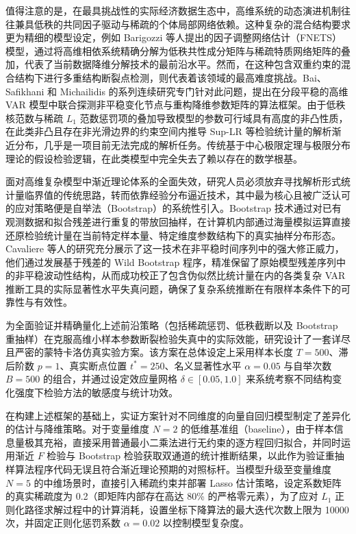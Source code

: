 \documentclass[UTF8,a4paper,12pt]{ctexbook}
\begin{document}
值得注意的是，在最具挑战性的实际经济数据生态中，高维系统的动态演进机制往往兼具低秩的共同因子驱动与稀疏的个体局部网络依赖。这种复杂的混合结构要求更为精细的模型设定，例如 Barigozzi 等人提出的因子调整网络估计（FNETS）模型，通过将高维相依系统精确分解为低秩共性成分矩阵与稀疏特质网络矩阵的叠加，代表了当前数据降维分解技术的最前沿水平。然而，在这种包含双重约束的混合结构下进行多重结构断裂点检测，则代表着该领域的最高难度挑战。Bai、Safikhani 和 Michailidis 的系列连续研究专门针对此问题，提出在分段平稳的高维 VAR 模型中联合探测非平稳变化节点与重构降维参数矩阵的算法框架。由于低秩核范数与稀疏 $L_1$ 范数惩罚项的叠加导致模型的参数可行域具有高度的非凸性质，在此类非凸且存在非光滑边界的约束空间内推导 Sup-LR 等检验统计量的解析渐近分布，几乎是一项目前无法完成的解析任务。传统基于中心极限定理与极限分布理论的假设检验逻辑，在此类模型中完全失去了赖以存在的数学根基。

面对高维复杂模型中渐近理论体系的全面失效，研究人员必须放弃寻找解析形式统计量临界值的传统思路，转而依靠经验分布逼近技术，其中最为核心且被广泛认可的应对策略便是自举法（Bootstrap）的系统性引入。Bootstrap 技术通过对已有观测数据和拟合残差进行重复的带放回抽样，在计算机内部通过海量模拟运算直接还原检验统计量在当前特定样本量、特定维度参数结构下的真实抽样分布形态。Cavaliere 等人的研究充分展示了这一技术在非平稳时间序列中的强大修正威力，他们通过发展基于残差的 Wild Bootstrap 程序，精准保留了原始模型残差序列中的非平稳波动性结构，从而成功校正了包含伪似然比统计量在内的各类复杂 VAR 推断工具的实际显著性水平失真问题，确保了复杂系统推断在有限样本条件下的可靠性与有效性。

为全面验证并精确量化上述前沿策略（包括稀疏惩罚、低秩截断以及 Bootstrap 重抽样）在克服高维小样本参数断裂检验失真中的实际效能，研究设计了一套详尽且严密的蒙特卡洛仿真实验方案。该方案在总体设定上采用样本长度 $T=500$、滞后阶数 $p=1$、真实断点位置 $t^*=250$、名义显著性水平 $\alpha=0.05$ 与自举次数 $B=500$ 的组合，并通过设定效应量网格 $\delta \in [0.05, 1.0]$ 来系统考察不同结构变化强度下检验方法的敏感度与统计功效。


在构建上述框架的基础上，实证方案针对不同维度的向量自回归模型制定了差异化的估计与降维策略。对于变量维度 $N=2$ 的低维基准组（baseline），由于样本信息量极其充裕，直接采用普通最小二乘法进行无约束的逐方程回归拟合，并同时运用渐近 $F$ 检验与 Bootstrap 检验获取双通道的统计推断结果，以此作为验证重抽样算法程序代码无误且符合渐近理论预期的对照标杆。当模型升级至变量维度 $N=5$ 的中维场景时，直接引入稀疏约束并部署 Lasso 估计策略，设定系数矩阵的真实稀疏度为 0.2（即矩阵内部存在高达 80\% 的严格零元素），为了应对 $L_1$ 正则化路径求解过程中的计算消耗，设置坐标下降算法的最大迭代次数上限为 10000 次，并固定正则化惩罚系数 $\alpha=0.02$ 以控制模型复杂度。
\end{document}
